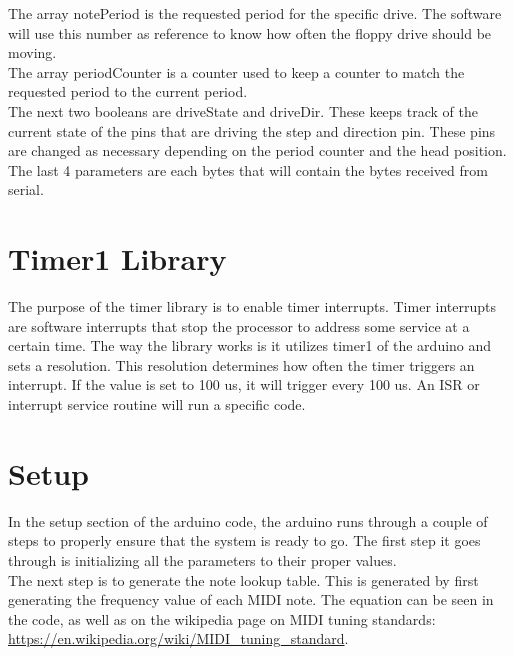 \documentclass[11pt, a4paper]{report}
\begin{document}
The array notePeriod is the requested period for the specific drive. The software will use this number as reference to know how often the floppy drive should be moving.\\

The array periodCounter is a counter used to keep a counter to match the requested period to the current period. \\

The next two booleans are driveState and driveDir. These keeps track of the current state of the pins that are driving the step and direction pin. These pins are changed as necessary depending on the period counter and the head position. \\

The last 4 parameters are each bytes that will contain the bytes received from serial. \\

\section{Timer1 Library}

The purpose of the timer library is to enable timer interrupts. Timer interrupts are software interrupts that stop the processor to address some service at a certain time. The way the library works is it utilizes timer1 of the arduino and sets a resolution. This resolution determines how often the timer triggers an interrupt. If the value is set to 100 us, it will trigger every 100 us. An ISR or interrupt service routine will run a specific code.

\section{Setup}

In the setup section of the arduino code, the arduino runs through a couple of steps to properly ensure that the system is ready to go. The first step it goes through is initializing all the parameters to their proper values. \\




The next step is to generate the note lookup table. This is generated by first generating the frequency value of each MIDI note. The equation can be seen in the code, as well as on the wikipedia page on MIDI tuning standards: \url{https://en.wikipedia.org/wiki/MIDI_tuning_standard}. \\
\end{document}
